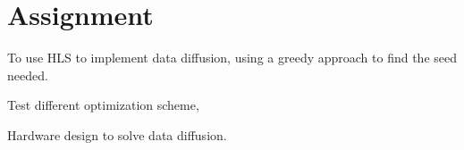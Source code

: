 \section{Assignment}
To use HLS to implement data diffusion, using a greedy approach to find the seed needed.

Test different optimization scheme, 

Hardware design to solve data diffusion.

